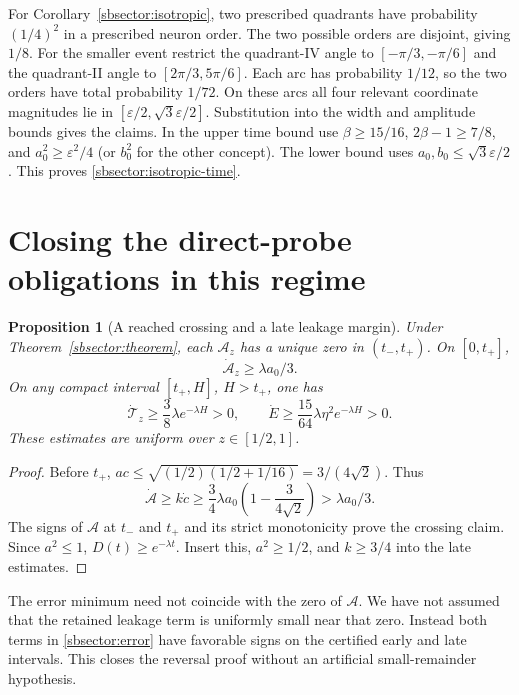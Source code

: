 \documentclass{article} %
\theoremstyle{plain}
\newtheorem{proposition}[theorem]{Proposition}
\theoremstyle{definition}
\theoremstyle{remark}
\begin{document}
For Corollary~\ref{sbsector:isotropic}, two prescribed quadrants have
probability $(1/4)^2$ in a prescribed neuron order. The two possible
orders are disjoint, giving $1/8$. For the smaller event restrict the
quadrant-IV angle to $[-\pi/3,-\pi/6]$ and the quadrant-II angle to
$[2\pi/3,5\pi/6]$. Each arc has probability $1/12$, so the two orders
have total probability $1/72$. On these arcs all four relevant coordinate
magnitudes lie in $[\varepsilon/2,\sqrt3\varepsilon/2]$.
Substitution into the width and amplitude bounds gives the claims.
In the upper time bound use
$\beta\ge15/16$, $2\beta-1\ge7/8$, and
$a_0^2\ge\varepsilon^2/4$ (or $b_0^2$ for the other concept).
The lower bound uses $a_0,b_0\le\sqrt3\varepsilon/2$.
This proves \eqref{sbsector:isotropic-time}.

\section{Closing the direct-probe obligations in this regime}
\label{sbsector:obligations}

\begin{proposition}[A reached crossing and a late leakage margin]
\label{sbsector:crossing}
Under Theorem~\ref{sbsector:theorem}, each $\mathcal A_z$ has a unique
zero in $(t_-,t_+)$. On $[0,t_+]$,
\[
 \dot{\mathcal A}_z\ge\lambda a_0/3.
\]
On any compact interval $[t_+,H]$, $H>t_+$, one has
\[
 \dot{\mathcal T}_z\ge\frac38\lambda e^{-\lambda H}>0,
 \qquad
 \dot E\ge\frac{15}{64}\lambda\eta^2e^{-\lambda H}>0.
\]
These estimates are uniform over $z\in[1/2,1]$.
\end{proposition}
\begin{proof}
Before $t_+$, $ac\le\sqrt{(1/2)(1/2+1/16)}=3/(4\sqrt2)$.
Thus
\[
 \dot{\mathcal A}\ge k\dot c
 \ge\frac34\lambda a_0\left(1-\frac3{4\sqrt2}\right)
 >\lambda a_0/3.
\]
The signs of $\mathcal A$ at $t_-$ and $t_+$ and its strict
monotonicity prove the crossing claim. Since $a^2\le1$,
$D(t)\ge e^{-\lambda t}$. Insert this, $a^2\ge1/2$, and
$k\ge3/4$ into the late estimates.
\end{proof}

The error minimum need not coincide with the zero of $\mathcal A$.
We have not assumed that the retained leakage term is uniformly small
near that zero. Instead both terms in \eqref{sbsector:error} have
favorable signs on the certified early and late intervals. This closes
the reversal proof without an artificial small-remainder hypothesis.
\end{document}
